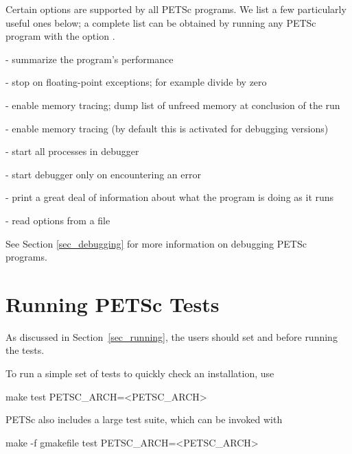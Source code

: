 Certain options are supported by all PETSc programs.  We list a few
particularly useful ones below; a complete list can be obtained by
running any PETSc program with the option .
\begin{tightitemize}
\item {} - summarize the program's performance
\item {} - stop on floating-point exceptions; 
      for example divide by zero
\item {} - enable memory tracing; dump list of unfreed memory
      at conclusion  of the run
\item {} - enable memory tracing (by default this is
      activated for debugging versions)
\item {}  
     - start all processes in debugger  
\item {}  
       - start debugger only on encountering an error
\item {} - print a great deal of information about what the program is doing as it runs
\item {}  - read options from a file
\end{tightitemize}
See Section \ref{sec_debugging} for more information on debugging PETSc programs.


\section{Running PETSc Tests}
\label{sec_runningtests}

As discussed in Section~\ref{sec_running}, 
the users should set  and  before running
the tests.

To run a simple set of tests to quickly check an installation, use
\begin{bashlisting}
make test PETSC_ARCH=<PETSC_ARCH>
\end{bashlisting}

PETSc also includes a large test suite, which can be invoked with
\begin{bashlisting}
make -f gmakefile test PETSC_ARCH=<PETSC_ARCH>
\end{bashlisting}

